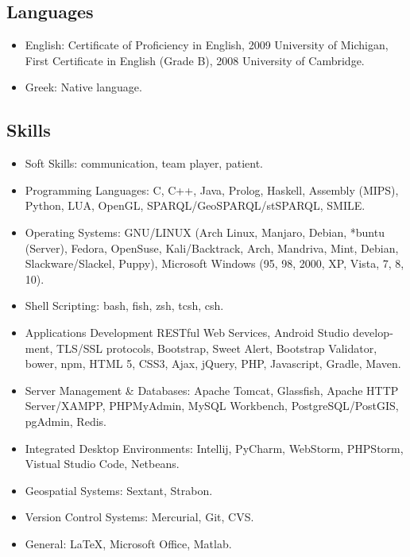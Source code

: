 \documentclass[a4paper,oneside,11pt]{article}
\begin{document}
\subsection*{Languages}

\begin{itemize}

\item English: \textlatin{Certificate of Proficiency in English, 2009 University of Michigan, First Certificate in English (Grade B), 2008 University of Cambridge.}

\item Greek: Native language.

\end{itemize}

\subsection*{Skills}

\begin{itemize}

\item Soft Skills: communication, team player, patient.

\item Programming Languages: \textlatin{C, C++, Java, Prolog, Haskell, Assembly (MIPS), Python, LUA, OpenGL, SPARQL/GeoSPARQL/stSPARQL, SMILE}.

\item Operating Systems: \textlatin{GNU/LINUX (Arch Linux, Manjaro, Debian, *buntu (Server), Fedora, OpenSuse, Kali/Backtrack, Arch, Mandriva, Mint, Debian, Slackware/Slackel, Puppy), Microsoft Windows (95, 98, 2000, XP, Vista, 7, 8, 10)}.

\item Shell Scripting: \textlatin{bash, fish, zsh, tcsh, csh}.

\item Applications Development \textlatin{RESTful Web Services, Android Studio development, TLS/SSL protocols, Bootstrap, Sweet Alert, Bootstrap Validator, bower, npm, HTML 5, CSS3, Ajax, jQuery, PHP, Javascript, Gradle, Maven}.

\item Server Management \& Databases: \textlatin{Apache Tomcat, Glassfish, Apache HTTP Server/XAMPP, PHPMyAdmin, MySQL Workbench, PostgreSQL/PostGIS, pgAdmin, Redis}.

\item Integrated Desktop Environments: \textlatin{Intellij, PyCharm, WebStorm, PHPStorm, Vistual Studio Code, Netbeans}.

\item Geospatial Systems: \textlatin{Sextant, Strabon}.

\item Version Control Systems: \textlatin{Mercurial, Git, CVS}.

\item General: \textlatin{\LaTeX, Microsoft Office, Matlab}.

\end{itemize}
\end{document}
